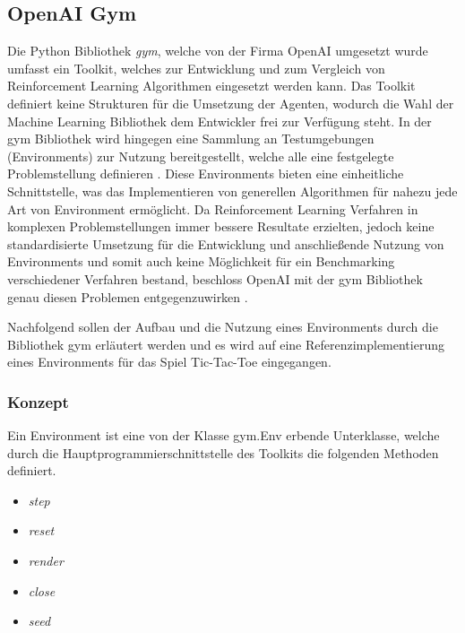 \documentclass[11pt]{scrartcl}
\begin{document}
\subsection{OpenAI Gym}
Die Python Bibliothek \textit{gym}, welche von der Firma OpenAI umgesetzt wurde umfasst ein
Toolkit, welches zur Entwicklung und zum Vergleich von Reinforcement Learning Algorithmen
eingesetzt werden kann. Das Toolkit definiert keine Strukturen für die Umsetzung der Agenten,
wodurch die Wahl der Machine Learning Bibliothek dem Entwickler frei zur Verfügung steht. In
der gym Bibliothek wird hingegen eine Sammlung an Testumgebungen (Environments) zur Nutzung
bereitgestellt, welche alle eine festgelegte Problemstellung definieren \cite{OAI2016}. 
Diese Environments bieten eine einheitliche Schnittstelle, was das Implementieren von
generellen Algorithmen für nahezu jede Art von Environment ermöglicht. Da Reinforcement
Learning Verfahren in komplexen Problemstellungen immer bessere Resultate erzielten, jedoch
keine standardisierte Umsetzung für die Entwicklung und anschließende Nutzung von Environments
und somit auch keine Möglichkeit für ein Benchmarking verschiedener Verfahren bestand,
beschloss OpenAI mit der gym Bibliothek genau diesen Problemen entgegenzuwirken
\cite{OAI2016}.

Nachfolgend sollen der Aufbau und die Nutzung eines Environments durch die Bibliothek gym
erläutert werden und es wird auf eine Referenzimplementierung eines Environments für das
Spiel Tic-Tac-Toe eingegangen.

\subsubsection{Konzept}
Ein Environment ist eine von der Klasse gym.Env erbende Unterklasse, welche durch die
Hauptprogrammierschnittstelle des Toolkits die folgenden Methoden definiert.

\begin{itemize}
\itemsep-6pt
\item \textit{step}
\item \textit{reset}
\item \textit{render}
\item \textit{close}
\item \textit{seed}
\end{itemize}  
\end{document}
